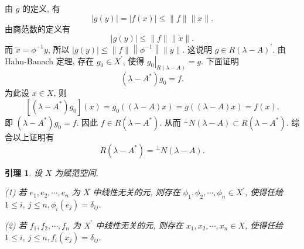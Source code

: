 \documentclass[openany]{ctexbook}
\makeatletter
\theoremstyle{kaiti}
\newtheorem{lemma}{引理}[section]
\theoremstyle{normal}
\renewenvironment{proof}[1][\proofname]{\par
    \pushQED{\qed}%
    \normalfont \topsep6\p@\@plus6\p@\relax
    \trivlist
    \item\relax
    {\heiti #1}\hspace{2\labelsep}\ignorespaces
  }{%
    \popQED\endtrivlist\@endpefalse
  }
\makeatother
\begin{document}
\begin{proof}
由 $g$ 的定义, 有
$$
|g(y)|=|f(x)| \leqslant\|f\|\|x\|.
$$
由商范数的定义有
$$
|g(y)| \leqslant\|f\|\|\tilde{x}\|.
$$
而 $\tilde{x}=\phi^{-1} y$, 所以 $|g(y)| \leqslant\|f\|\left\|\phi^{-1}\right\|\|y\|$. 这说明 $g \in R(\lambda-A)^{\prime}$.
由 Hahn-Banach 定理, 存在 $g_0 \in X^{\prime}$, 使得 $\left.g_0\right|_{R(\lambda-A)}=g$. 下面证明
$$
\left(\lambda-A^{*}\right) g_0=f.
$$
为此设 $x \in X$, 则
$$
\left[\left(\lambda-A^{*}\right) g_0\right](x)=g_0((\lambda-A) x)=g((\lambda-A) x)=f(x).
$$
即 $\left(\lambda-A^{*}\right) g_0=f$. 因此 $f \in R\left(\lambda-A^{*}\right)$. 从而 ${ }^{\perp} N(\lambda-A) \subset R\left(\lambda-A^{*}\right)$. 综合以上证明有
$$
R\left(\lambda-A^{*}\right)={ }^{\perp} N(\lambda-A).
$$
\end{proof}

\begin{lemma}
设 $X$ 为赋范空间.

(1) 若 $e_1, e_2, \cdots, e_n$ 为 $X$ 中线性无关的元, 则存在 $\phi_1, \phi_2, \cdots, \phi_n \in X^{\prime}$, 使得任给 $1 \leqslant i$, $j \leqslant n, \phi_{i}\left(e_{j}\right)=\delta_{i j}$.

(2) 若 $f_1, f_2, \cdots, f_n$ 为 $X^{\prime}$ 中线性无关的元, 则存在 $x_1, x_2, \cdots, x_n \in X$, 使得任给 $1 \leqslant i$, $j \leqslant n, f_{i}\left(x_{j}\right)=\delta_{i j}$.
\end{lemma}
\end{document}
